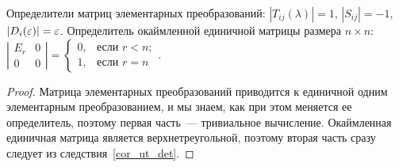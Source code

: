 \begin{proposition}\label{prop_det_of_elementary}
Определители матриц элементарных преобразований:
$|T_{ij}(\lambda)|=1$, $|S_{ij}|=-1$, $|D_i(\varepsilon)|=\varepsilon$.
Определитель окаймленной единичной матрицы размера $n\times n$:
$\left|\begin{matrix}E_r & 0 \\ 0 & 0\end{matrix}\right|=\begin{cases}0,
  &\text{если }r<n;\\1, &\text{если }r=n\end{cases}$.
\end{proposition}
\begin{proof}
Матрица элементарных преобразований приводится к единичной одним
элементарным преобразованием, и мы знаем, как при этом меняется ее
определитель, поэтому первая часть~--- тривиальное вычисление.
Окаймленная единичная матрица является верхнетреугольной, поэтому
вторая часть сразу следует из следствия~\ref{cor_ut_det}.
\end{proof}

